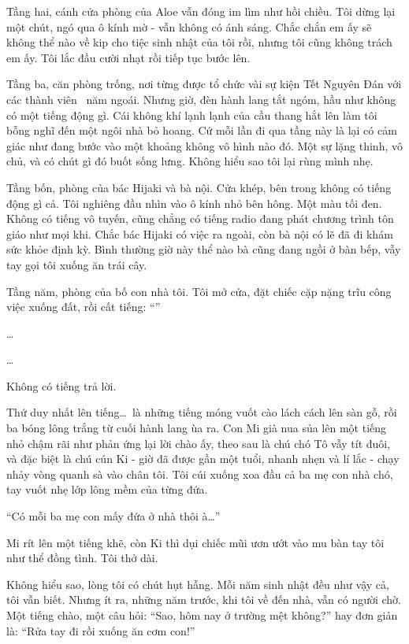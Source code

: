 \documentclass[../main.tex]{subfiles}
\begin{document}
Tầng hai, cánh cửa phòng của Aloe vẫn đóng im lìm như hồi chiều. Tôi dừng lại một chút, ngó qua ô kính mờ - vẫn không có ánh sáng. Chắc chắn em ấy sẽ không thể nào về kip cho tiệc sinh nhật của tôi rồi, nhưng tôi cũng không trách em ấy. Tôi lắc đầu cười nhạt rồi tiếp tục bước lên.

Tầng ba, căn phòng trống, nơi từng được tổ chức vài sự kiện Tết Nguyên Đán với các thành viên \hll\ năm ngoái. Nhưng giờ, đèn hành lang tắt ngóm, hầu như không có một tiếng động gì. Cái không khí lạnh lạnh của cầu thang hắt lên làm tôi bỗng nghĩ đến một ngôi nhà bỏ hoang. Cứ mỗi lần đi qua tầng này là lại có cảm giác như đang bước vào một khoảng không vô hình nào đó. Một sự lặng thinh, vô chủ, và có chút gì đó buốt sống lưng. Không hiểu sao tôi lại rùng mình nhẹ.

Tầng bốn, phòng của bác Hijaki và bà nội. Cửa khép, bên trong không có tiếng động gì cả. Tôi nghiêng đầu nhìn vào ô kính nhỏ bên hông. Một màu tối đen. Không có tiếng vô tuyến, cũng chẳng có tiếng radio đang phát chương trình tôn giáo như mọi khi. Chắc bác Hijaki có việc ra ngoài, còn bà nội có lẽ đã đi khám sức khỏe định kỳ. Bình thường giờ này thể nào bà cũng đang ngồi ở bàn bếp, vẫy tay gọi tôi xuống ăn trái cây.

Tầng năm, phòng của bố con nhà tôi. Tôi mở cửa, đặt chiếc cặp nặng trĩu công việc xuống đất, rồi cất tiếng: ``''

\dots

\dots

Không có tiếng trả lời.

Thứ duy nhất lên tiếng\dots\ là những tiếng móng vuốt cào lách cách lên sàn gỗ, rồi ba bóng lông trắng từ cuối hành lang ùa ra. Con Mi già nua sủa lên một tiếng nhỏ chậm rãi như phản ứng lại lời chào ấy, theo sau là chú chó Tô vẫy tít đuôi, và đặc biệt là chú cún Ki - giờ đã được gần một tuổi, nhanh nhẹn và lí lắc - chạy nhảy vòng quanh sà vào chân tôi. Tôi cúi xuống xoa đầu cả ba mẹ con nhà chó, tay vuốt nhẹ lớp lông mềm của từng đứa.

``Có mỗi ba mẹ con mấy đứa ở nhà thôi à\dots''

Mi rít lên một tiếng khẽ, còn Ki thì dụi chiếc mũi ươn ướt vào mu bàn tay tôi như thể đồng tình. Tôi thở dài.

Không hiểu sao, lòng tôi có chút hụt hẫng. Mỗi năm sinh nhật đều như vậy cả, tôi vẫn biết. Nhưng ít ra, những năm trước, khi tôi về đến nhà, vẫn có người chờ. Một tiếng chào, một câu hỏi: ``Sao, hôm nay ở trường mệt không?'' hay đơn giản là: ``Rửa tay đi rồi xuống ăn cơm con!''
\end{document}
